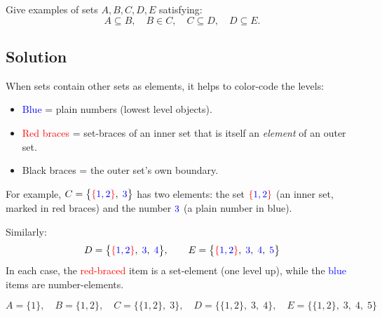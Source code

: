 \documentclass[12pt, a4paper]{article}
\begin{document}
\begin{problembox}
Give examples of sets $A, B, C, D, E$ satisfying:
\[
  A \subseteq B, \quad B \in C, \quad C \subseteq D, \quad D \subseteq E.
\]
\end{problembox}

\subsection*{Solution}

\begin{tcolorbox}[colback=gray!3, colframe=gray!60, arc=2mm, left=5pt, right=5pt, top=5pt, bottom=5pt, title={\small Color Guide: Seeing the Nesting Levels}]
When sets contain other sets as elements, it helps to color-code the levels:
\begin{itemize}[nosep]
  \item \textcolor{blue}{Blue} = plain numbers (lowest level objects).
  \item \textcolor{red}{Red braces} = set-braces of an inner set that is itself an \emph{element} of an outer set.
  \item Black braces = the outer set's own boundary.
\end{itemize}

\medskip
For example, $C = \bigl\{\textcolor{red}{\{}\textcolor{blue}{1,2}\textcolor{red}{\}},\;\textcolor{blue}{3}\bigr\}$ has two elements:
the set $\textcolor{red}{\{}\textcolor{blue}{1,2}\textcolor{red}{\}}$ (an inner set, marked in red braces) and the number $\textcolor{blue}{3}$ (a plain number in blue).

\medskip
Similarly:
\[
  D = \bigl\{\textcolor{red}{\{}\textcolor{blue}{1,2}\textcolor{red}{\}},\;\textcolor{blue}{3},\;\textcolor{blue}{4}\bigr\},
  \qquad
  E = \bigl\{\textcolor{red}{\{}\textcolor{blue}{1,2}\textcolor{red}{\}},\;\textcolor{blue}{3},\;\textcolor{blue}{4},\;\textcolor{blue}{5}\bigr\}
\]
In each case, the \textcolor{red}{red-braced} item is a set-element (one level up), while the \textcolor{blue}{blue} items are number-elements.
\end{tcolorbox}

\[
  A = \{1\}, \quad B = \{1,2\}, \quad C = \bigl\{\{1,2\},\;3\bigr\}, \quad
  D = \bigl\{\{1,2\},\;3,\;4\bigr\}, \quad E = \bigl\{\{1,2\},\;3,\;4,\;5\bigr\}
\]
\end{document}
